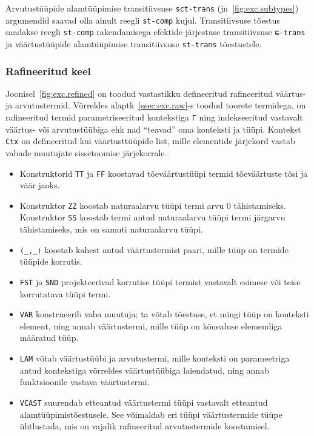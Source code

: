 \documentclass[a4paper,12pt]{article}
\begin{document}
Arvutustüüpide alamtüüpimise transitiivsuse {\tt sct-trans} (jn~\ref{fig:exc.subtypes}) argumendid saavad olla ainult reegli {\tt st-comp} kujul. Transitiivsuse tõestus saadakse reegli {\tt st-comp} rakendamisega efektide järjestuse transitiivsuse {\tt ⊑-trans} ja väärtustüüpide alamtüüpimise transitiivsuse {\tt st-trans} tõestustele.

\subsubsection{Rafineeritud keel}

Joonisel~\ref{fig:exc.refined} on toodud vastastikku defineeritud rafineeritud väärtus- ja arvutustermid.
Võrreldes alaptk~\ref{ssec:exc.raw}-s toodud toorete termidega, on rafineeritud termid parametriseeritud kontekstiga {\tt Γ} ning indekseeritud vastavalt väärtus- või arvutustüübiga ehk nad ``teavad'' oma konteksti ja tüüpi.
Kontekst {\tt Ctx} on defineeritud kui väärtusttüüpide list, mille elementide järjekord vastab vabade muutujate sissetoomise järjekorrale.
\begin{itemize}
\item Konstruktorid {\tt TT} ja {\tt FF} koostavad tõeväärtustüüpi termid tõeväärtuste tõsi ja väär jaoks.
\item Konstruktor {\tt ZZ} koostab naturaalarvu tüüpi termi arvu 0 tähistamiseks. Konstruktor {\tt SS} koostab termi antud naturaalarvu tüüpi termi järgarvu tähistamiseks, mis on samuti naturaalarvu tüüpi.
\item {\tt ⟨_,_⟩} koostab kahest antud väärtustermist paari, mille tüüp on termide tüüpide korrutis.
\item {\tt FST} ja {\tt SND} projekteerivad korrutise tüüpi termist vastavalt esimese või teise korrutatava tüüpi termi.
\item {\tt VAR} konstrueerib vaba muutuja; ta võtab tõestuse, et mingi tüüp on konteksti element, ning annab väärtustermi, mille tüüp on kõnealuse elemendiga määratud tüüp.
\item {\tt LAM} võtab väärtustüübi ja arvutustermi, mille konteksti on parameetriga antud kontekstiga võrreldes väärtustüübiga laiendatud, ning annab funktsioonile vastava väärtustermi.
\item {\tt VCAST} suurendab etteantud väärtustermi tüüpi vastavalt etteantud alamtüüpimistõestusele. See võimaldab eri tüüpi väärtustermide tüüpe ühtlustada, mis on vajalik rafineeritud arvutustermide koostamisel.
\end{itemize}
\end{document}
